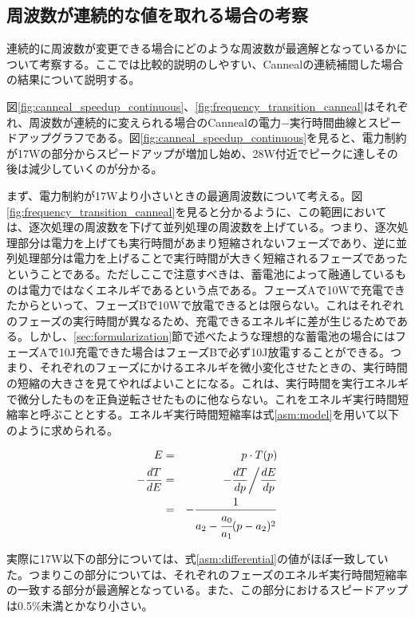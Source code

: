 \subsection{周波数が連続的な値を取れる場合の考察}
\label{subsec:continuous}


連続的に周波数が変更できる場合にどのような周波数が最適解となっているかについて考察する。ここでは比較的説明のしやすい、Cannealの連続補間した場合の結果について説明する。

図\ref{fig:canneal_speedup_continuous}、\ref{fig:frequency_transition_canneal}はそれぞれ、周波数が連続的に変えられる場合のCannealの電力−実行時間曲線とスピードアップグラフである。図\ref{fig:canneal_speedup_continuous}を見ると、電力制約が17Wの部分からスピードアップが増加し始め、28W付近でピークに達しその後は減少していくのが分かる。

まず、電力制約が17Wより小さいときの最適周波数について考える。図\ref{fig:frequency_transition_canneal}を見ると分かるように、この範囲においては、逐次処理の周波数を下げて並列処理の周波数を上げている。つまり、逐次処理部分は電力を上げても実行時間があまり短縮されないフェーズであり、逆に並列処理部分は電力を上げることで実行時間が大きく短縮されるフェーズであったということである。ただしここで注意すべきは、蓄電池によって融通しているものは電力ではなくエネルギであるという点である。フェーズAで10Wで充電できたからといって、フェーズBで10Wで放電できるとは限らない。これはそれぞれのフェーズの実行時間が異なるため、充電できるエネルギに差が生じるためである。しかし、\ref{sec:formularization}節で述べたような理想的な蓄電池の場合にはフェーズAで10J充電できた場合はフェーズBで必ず10J放電することができる。つまり、それぞれのフェーズにかけるエネルギを微小変化させたときの、実行時間の短縮の大きさを見てやればよいことになる。これは、実行時間を実行エネルギで微分したものを正負逆転させたものに他ならない。これをエネルギ実行時間短縮率と呼ぶこととする。エネルギ実行時間短縮率は式\ref{asm:model}を用いて以下のように求められる。

\begin{eqnarray}
E &=& p \cdot T(p)\\
-\frac{dT}{dE} &=& -\frac{dT}{dp} \bigg/ \frac{dE}{dp}\\
&=& -\frac{1}{a_2 - \cfrac{a_0}{a_1}( p-a_2)^2} \label{asm:differential}
\end{eqnarray}

実際に17W以下の部分については、式\ref{asm:differential}の値がほぼ一致していた。つまりこの部分については、それぞれのフェーズのエネルギ実行時間短縮率の一致する部分が最適解となっている。また、この部分におけるスピードアップは0.5\%未満とかなり小さい。

